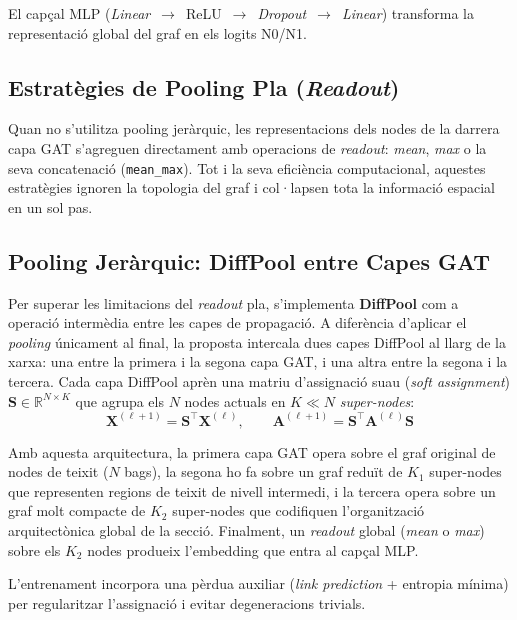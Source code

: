 \documentclass[10pt,a4paper,twocolumn,twoside]{article}
\begin{document}
El capçal MLP (\textit{Linear}~$\to$~ReLU~$\to$~\textit{Dropout}~$\to$~\textit{Linear}) transforma la
representació global del graf en els logits N0/N1.

\subsection{Estratègies de Pooling Pla (\textit{Readout})}

Quan no s'utilitza pooling jeràrquic, les representacions dels nodes de la darrera capa GAT s'agreguen
directament amb operacions de \textit{readout}: \textit{mean}, \textit{max} o la seva concatenació
(\texttt{mean\_max}). Tot i la seva eficiència computacional, aquestes estratègies ignoren la topologia del
graf i col·lapsen tota la informació espacial en un sol pas.

\subsection{Pooling Jeràrquic: DiffPool entre Capes GAT}

Per superar les limitacions del \textit{readout} pla, s'implementa \textbf{DiffPool}
\cite{ying2019hierarchicalgraphrepresentationlearning} com a operació intermèdia entre les capes de
propagació. A diferència d'aplicar el \textit{pooling} únicament al final, la proposta intercala dues
capes DiffPool al llarg de la xarxa: una entre la primera i la segona capa GAT, i una altra entre la
segona i la tercera. Cada capa DiffPool aprèn una matriu d'assignació suau (\textit{soft assignment})
$\mathbf{S} \in \mathbb{R}^{N \times K}$ que agrupa els $N$ nodes actuals en $K \ll N$
\textit{super-nodes}:
\begin{equation*}
  \mathbf{X}^{(\ell+1)} = \mathbf{S}^{\top}\mathbf{X}^{(\ell)}, \qquad
  \mathbf{A}^{(\ell+1)} = \mathbf{S}^{\top}\mathbf{A}^{(\ell)}\mathbf{S}
\end{equation*}

Amb aquesta arquitectura, la primera capa GAT opera sobre el graf original de nodes de teixit
($N$ bags), la segona ho fa sobre un graf reduït de $K_1$ super-nodes que representen regions de teixit
de nivell intermedi, i la tercera opera sobre un graf molt compacte de $K_2$ super-nodes que codifiquen
l'organització arquitectònica global de la secció. Finalment, un \textit{readout} global (\textit{mean}
o \textit{max}) sobre els $K_2$ nodes produeix l'embedding que entra al capçal MLP.

L'entrenament incorpora una pèrdua auxiliar (\textit{link prediction} + entropia mínima) per
regularitzar l'assignació i evitar degeneracions trivials.
\end{document}
